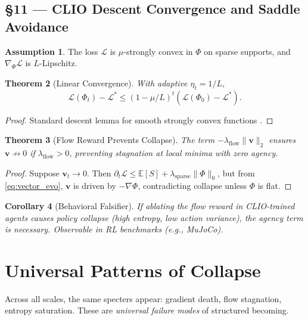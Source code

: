 \documentclass[11pt]{article}
\newtheorem{theorem}{Theorem}[section]
\newtheorem{corollary}[theorem]{Corollary}
\theoremstyle{definition}
\newtheorem{assumption}[theorem]{Assumption}
\theoremstyle{remark}
\newcommand{\vect}[1]{\bm{#1}}
\begin{document}
\subsection*{§11 — CLIO Descent Convergence and Saddle Avoidance}

\begin{assumption}
\label{ass:clio}
The loss $\mathcal{L}$ is $\mu$-strongly convex in $\Phi$ on sparse supports, and $\nabla_\Phi \mathcal{L}$ is $L$-Lipschitz.
\end{assumption}

\begin{theorem}[Linear Convergence]
With adaptive $\eta_t = 1/L$,
\[
\mathcal{L}(\Phi_{t}) - \mathcal{L}^* \le (1 - \mu/L)^t (\mathcal{L}(\Phi_0) - \mathcal{L}^*).
\]
\end{theorem}

\begin{proof}
Standard descent lemma for smooth strongly convex functions \cite{Nesterov2004}.
\end{proof}

\begin{theorem}[Flow Reward Prevents Collapse]
The term $-\lambda_{\mathrm{flow}} \|\vect{v}\|_2$ ensures $\vect{v} \not\to 0$ if $\lambda_{\mathrm{flow}} > 0$, preventing stagnation at local minima with zero agency.
\end{theorem}

\begin{proof}
Suppose $\vect{v}_t \to 0$. Then $\partial_t \mathcal{L} \le \mathbb{E}[S] + \lambda_{\mathrm{sparse}} \|\Phi\|_0$, but from \eqref{eq:vector_evo}, $\vect{v}$ is driven by $-\nabla \Phi$, contradicting collapse unless $\Phi$ is flat.
\end{proof}

\begin{corollary}[Behavioral Falsifier]
If ablating the flow reward in CLIO-trained agents causes policy collapse (high entropy, low action variance), the agency term is necessary. Observable in RL benchmarks (e.g., MuJoCo).
\end{corollary}


\section{Universal Patterns of Collapse}
Across all scales, the same specters appear: gradient death, flow stagnation, entropy saturation. These are \emph{universal failure modes} of structured becoming.
\end{document}

